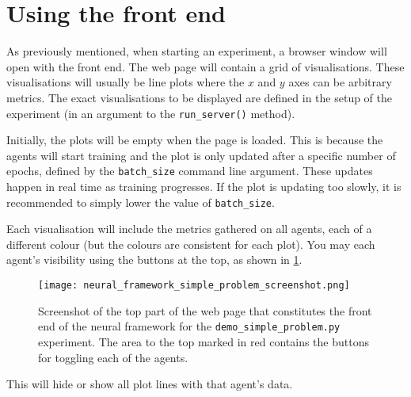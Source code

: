 \section{Using the front end}
As previously mentioned, when starting an experiment, a browser window will open with the front end.
The web page will contain a grid of visualisations. 
These visualisations will usually be line plots where the $x$ and $y$ axes can be arbitrary metrics.
The exact visualisations to be displayed are defined in the setup of the experiment (in an argument to the \texttt{run\_server()} method).

Initially, the plots will be empty when the page is loaded. 
This is because the agents will start training and the plot is only updated after a specific number of epochs, defined by the \texttt{batch\_size} command line argument.
These updates happen in real time as training progresses.
If the plot is updating too slowly, it is recommended to simply lower the value of \texttt{batch\_size}.

Each visualisation will include the metrics gathered on all agents, each of a different colour (but the colours are consistent for each plot).
You may each agent's visibility using the buttons at the top, as shown in \ref{fig:framework_front_end_screenshot}.
\begin{figure}
    \centering
    \texttt{[image: neural\_framework\_simple\_problem\_screenshot.png]}
    \caption{Screenshot of the top part of the web page that constitutes the front end of the neural framework for the \texttt{demo\_simple\_problem.py} experiment. The area to the top marked in red contains the buttons for toggling each of the agents.}
    \label{fig:framework_front_end_screenshot}
\end{figure}
This will hide or show all plot lines with that agent's data.